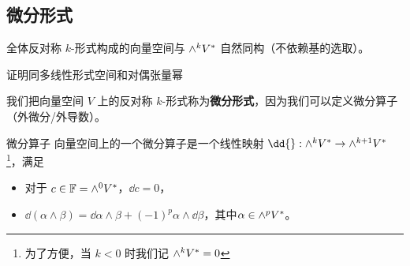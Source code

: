 

\subsection{微分形式}

\begin{theorem}{}
全体反对称 $k$-形式构成的向量空间与 ${\large \wedge}^k V^*$ 自然同构（不依赖基的选取）。
\end{theorem}
证明同多线性形式空间和对偶张量幂

我们把向量空间 $V$ 上的反对称 $k$-形式称为\textbf{微分形式}，因为我们可以定义微分算子（外微分/外导数）。

\begin{definition}{微分算子}
向量空间上的一个微分算子是一个线性映射 $\dd{} : {\large \wedge}^k V^* \to {\large \wedge}^{k + 1} V^*$\footnote{为了方便，当 $k < 0$ 时我们记 ${\large \wedge}^k V^* = 0$}，满足
\begin{itemize}
\item 对于 $c \in \mathbb{F} = {\large \wedge}^0 V^*$，$\dd c = 0$，
\item $\dd(\alpha \wedge \beta) = \dd\alpha \wedge \beta + (-1)^p \alpha \wedge \dd\beta$，其中$\alpha \in {\large \wedge}^p V^*$。
\end{itemize}


\end{definition}
